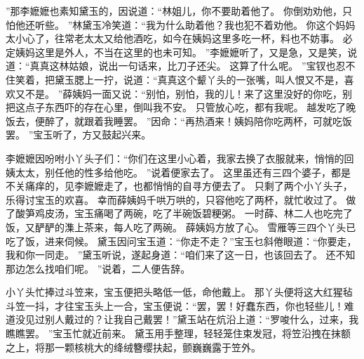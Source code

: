 ”那李嬷嬷也素知黛玉的，因说道：“林姐儿，你不要助着他了。
你倒劝劝他，只怕他还听些。
”林黛玉冷笑道：“我为什么助着他？我也犯不着劝他。
你这个妈妈太小心了，往常老太太又给他酒吃，如今在姨妈这里多吃一杯，料也不妨事。
必定姨妈这里是外人，不当在这里的也未可知。
”李嬷嬷听了，又是急，又是笑，说道：“真真这林姑娘，说出一句话来，比刀子还尖。
这算了什么呢。
”宝钗也忍不住笑着，把黛玉腮上一拧，说道：“真真这个颦丫头的一张嘴，叫人恨又不是，喜欢又不是。
”薛姨妈一面又说：“别怕，别怕，我的儿！来了这里没好的你吃，别把这点子东西吓的存在心里，倒叫我不安。
只管放心吃，都有我呢。
越发吃了晚饭去，便醉了，就跟着我睡罢。
”因命：“再热酒来！姨妈陪你吃两杯，可就吃饭罢。
”宝玉听了，方又鼓起兴来。
\par
李嬷嬷因吩咐小丫头子们：“你们在这里小心着，我家去换了衣服就来，悄悄的回姨太太，别任他的性多给他吃。
”说着便家去了。
这里虽还有三四个婆子，都是不关痛痒的，见李嬷嬷走了，也都悄悄的自寻方便去了。
只剩了两个小丫头子，乐得讨宝玉的欢喜。
幸而薛姨妈千哄万哄的，只容他吃了两杯，就忙收过了。
做了酸笋鸡皮汤，宝玉痛喝了两碗，吃了半碗饭碧粳粥。
一时薛、林二人也吃完了饭，又酽酽的潗上茶来，每人吃了两碗。
薛姨妈方放了心。
雪雁等三四个丫头已吃了饭，进来伺候。
黛玉因问宝玉道：“你走不走？”宝玉乜斜倦眼道：“你要走，我和你一同走。
”黛玉听说，遂起身道：“咱们来了这一日，也该回去了。
还不知那边怎么找咱们呢。
”说着，二人便告辞。
\par
小丫头忙捧过斗笠来，宝玉便把头略低一低，命他戴上。
那丫头便将这大红猩毡斗笠一抖，才往宝玉头上一合，宝玉便说：“罢，罢！好蠢东西，你也轻些儿！难道没见过别人戴过的？让我自己戴罢！”黛玉站在炕沿上道：“罗唆什么，过来，我瞧瞧罢。
”宝玉忙就近前来。
黛玉用手整理，轻轻笼住束发冠，将笠沿拽在抹额之上，将那一颗核桃大的绛绒簪缨扶起，颤巍巍露于笠外。
